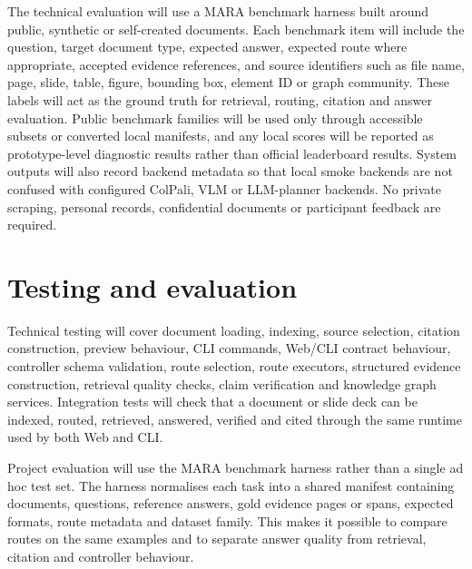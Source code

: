 \documentclass[a4paper,11pt]{article}
\begin{document}
The technical evaluation will use a MARA benchmark harness built around public, synthetic or self-created documents. Each benchmark item will include the question, target document type, expected answer, expected route where appropriate, accepted evidence references, and source identifiers such as file name, page, slide, table, figure, bounding box, element ID or graph community. These labels will act as the ground truth for retrieval, routing, citation and answer evaluation. Public benchmark families will be used only through accessible subsets or converted local manifests, and any local scores will be reported as prototype-level diagnostic results rather than official leaderboard results. System outputs will also record backend metadata so that local smoke backends are not confused with configured ColPali, VLM or LLM-planner backends. No private scraping, personal records, confidential documents or participant feedback are required.

\section{Testing and evaluation}

Technical testing will cover document loading, indexing, source selection, citation construction, preview behaviour, CLI commands, Web/CLI contract behaviour, controller schema validation, route selection, route executors, structured evidence construction, retrieval quality checks, claim verification and knowledge graph services. Integration tests will check that a document or slide deck can be indexed, routed, retrieved, answered, verified and cited through the same runtime used by both Web and CLI.

Project evaluation will use the MARA benchmark harness rather than a single ad hoc test set. The harness normalises each task into a shared manifest containing documents, questions, reference answers, gold evidence pages or spans, expected formats, route metadata and dataset family. This makes it possible to compare routes on the same examples and to separate answer quality from retrieval, citation and controller behaviour.
\end{document}
